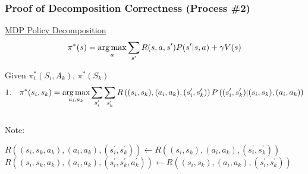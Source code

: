  \subsubsection{Proof of Decomposition Correctness (Process \#2)}

\underline{MDP Policy Decomposition}\\

\begin{equation*}
\pi^\ast(s) = \operatorname*{arg\,max}_{a} \sum_{s^\prime} R(s, a, s^\prime) P(s^\prime | s, a) +\gamma V(s)
\end{equation*}

Given $\pi^\ast_i(S_i,A_k)$, $\pi^\ast(S_k)$\\

\begin{equation*}
1.\quad \pi^\ast(s_i,s_k) = \operatorname*{arg\,max}_{a_i, a_k} \sum_{s^\prime_i} \sum_{s^\prime_k} R\left( (s_i,s_k),(a_i,a_k),(s^\prime_i,s^\prime_k)\right) P\left( (s^\prime_i, s^\prime_k) \middle| (s_i, s_k), (a_i, a_k)  \right)
\end{equation*}\\

Note:\qquad
\begin{minipage}[t]{10cm}
$R\left( (s_i,s_k,a_k),(a_i,a_k),(s^\prime_i,s^\prime_k) \right) \leftarrow R\left((s_i,s_k),(a_i,a_k),(s^\prime_i,s^\prime_k)\right)$\\
$R\left( (s_i,s_k,a_k),(a_i,a_k),(s^\prime_i,s^\prime_k,a^\prime_k) \right) \leftarrow R\left((s_i,s_k),(a_i,a_k),(s^\prime_i,s^\prime_k)\right)$
\end{minipage}\\


